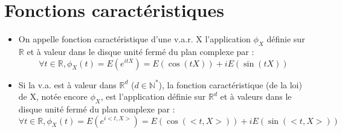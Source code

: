 \section{Fonctions caractéristiques}
\begin{Def}
\begin{itemize}
	\item On appelle fonction caractéristique d'une v.a.r. X l'application $\phi_X$ définie sur $\mathbb{R}$ et à valeur dans le disque unité fermé du plan complexe par : 
\[\forall t\in \mathbb{R}, \phi_X(t)=E(e^{itX})=E(\cos(tX))+iE(\sin(tX))\]
	\item Si la v.a. est à valeur dans $\mathbb{R}^d$ ($d\in \mathbb{N}^*$), la fonction caractéristique (de la loi) de X, notée encore $\phi_X$, est l'application définie
sur $\mathbb{R}^d$ et à valeurs dans le disque unité fermé du plan complexe par :
\[\forall t\in \mathbb{R}, \phi_X(t)=E(e^{i<t,X>})=E(\cos(<t,X>)) +iE(\sin(<t,X>))\]
\end{itemize}
\end{Def}


